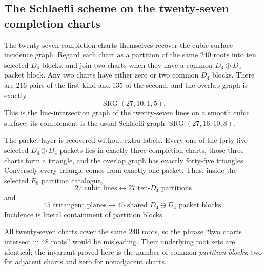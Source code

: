 \subsection{The Schlaefli scheme on the twenty-seven completion charts}
\label{sec:20260901-e8-partition-schlafli}

The twenty-seven completion charts themselves recover the cubic-surface
incidence graph.  Regard each chart as a partition of the same $240$ roots into
ten selected $D_4$ blocks, and join two charts when they have a common
$D_4\oplus D_4$ packet block.  Any two charts have either zero or two common
$D_4$ blocks.  There are $216$ pairs of the first kind and $135$ of the second,
and the overlap graph is exactly
\[
  \boxed{\operatorname{SRG}(27,10,1,5)}.
\]
This is the line-intersection graph of the twenty-seven lines on a smooth cubic
surface; its complement is the usual Schlaefli graph
$\operatorname{SRG}(27,16,10,8)$.

The packet layer is recovered without extra labels.  Every one of the
forty-five selected $D_4\oplus D_4$ packets lies in exactly three completion
charts, those three charts form a triangle, and the overlap graph has exactly
forty-five triangles.  Conversely every triangle comes from exactly one
packet.  Thus, inside the selected $E_8$ partition catalogue,
\[
  \boxed{27\text{ cubic lines}
  \longleftrightarrow27\text{ ten-}D_4\text{ partitions}}
\]
and
\[
  \boxed{45\text{ tritangent planes}
  \longleftrightarrow45\text{ shared }D_4\oplus D_4\text{ packet blocks}}.
\]
Incidence is literal containment of partition blocks.

All twenty-seven charts cover the same $240$ roots, so the phrase ``two charts
intersect in $48$ roots'' would be misleading.  Their underlying root sets are
identical; the invariant proved here is the number of common \emph{partition
blocks}: two for adjacent charts and zero for nonadjacent charts.
